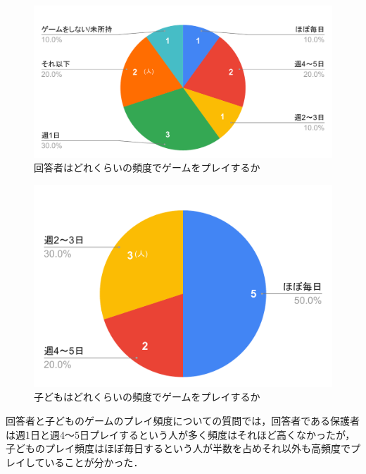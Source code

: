\documentclass[12pt,a4j,titlepage]{ltjsarticle}
\begin{document}
\begin{figure}[H]
 \begin{center}
  \includegraphics[keepaspectratio, scale=0.4]{chart2.pdf}
 \end{center}
 \caption{回答者はどれくらいの頻度でゲームをプレイするか}
 \label{fig:プレイ頻度(回答者)}
\end{figure}

\begin{figure}[H]
 \begin{center}
  \includegraphics[keepaspectratio, scale=0.4]{chart3.pdf}
 \end{center}
 \caption{子どもはどれくらいの頻度でゲームをプレイするか}
 \label{fig:プレイ頻度(子ども)}
\end{figure}

回答者と子どものゲームのプレイ頻度についての質問では，回答者である保護者は週1日と週4～5日プレイするという人が多く頻度はそれほど高くなかったが，子どものプレイ頻度はほぼ毎日するという人が半数を占めそれ以外も高頻度でプレイしていることが分かった．
\end{document}
